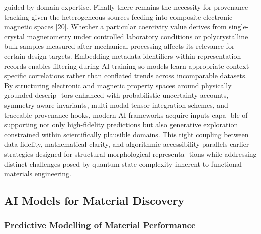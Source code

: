 \documentclass[
]{article}
\begin{document}
guided by domain expertise. Finally there remains the necessity for
provenance tracking given the heterogeneous sources feeding into
composite electronic--magnetic spaces {[}\hyperref[_bookmark60]{20}{]}.
Whether a particular coercivity value derives from single-crystal
magnetometry under controlled laboratory conditions or polycrystalline
bulk samples measured after mechanical processing affects its relevance
for certain design targets. Embedding metadata identifiers within
representation records enables filtering during AI training so models
learn appropriate context-specific correlations rather than conflated
trends across incomparable datasets. By structuring electronic and
magnetic property spaces around physically grounded descrip- tors
enhanced with probabilistic uncertainty accounts, symmetry-aware
invariants, multi-modal tensor integration schemes, and traceable
provenance hooks, modern AI frameworks acquire inputs capa- ble of
supporting not only high-fidelity predictions but also generative
exploration constrained within scientifically plausible domains. This
tight coupling between data fidelity, mathematical clarity, and
algorithmic accessibility parallels earlier strategies designed for
structural-morphological representa- tions while addressing distinct
challenges posed by quantum-state complexity inherent to functional
materials engineering.

\subsection{AI Models for Material
Discovery}\label{ai-models-for-material-discovery}

\subsubsection{Predictive Modelling of Material
Performance}\label{predictive-modelling-of-material-performance}
\end{document}
